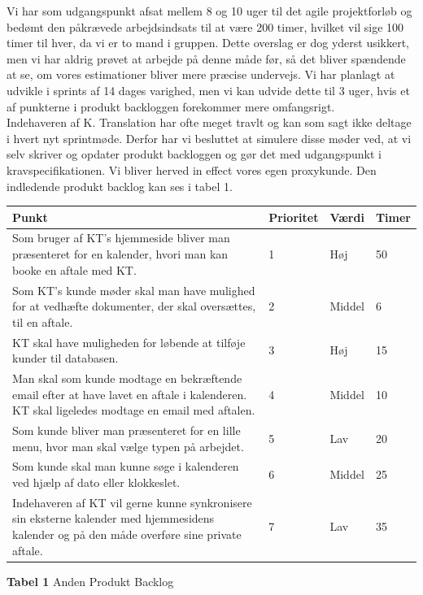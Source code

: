 \documentclass[12pt]{article}   %
\begin{document}
Vi har som udgangspunkt afsat mellem 8 og 10 uger til det agile projektforløb
og bedømt den påkrævede arbejdsindsats til at være 200 timer, hvilket vil sige 100
timer til hver, da vi er to mand i gruppen. Dette overslag er dog yderst
usikkert, men vi har aldrig prøvet at arbejde på denne måde før, så det bliver
spændende at se, om vores estimationer bliver mere præcise undervejs. Vi har
planlagt at udvikle i sprints af 14 dages varighed, men vi kan udvide dette til 3
uger, hvis et af punkterne i produkt backloggen forekommer mere omfangsrigt.\\
Indehaveren af K. Translation har ofte meget travlt og kan som sagt ikke
deltage i hvert nyt sprintmøde. Derfor har vi besluttet at simulere disse
møder ved, at vi selv skriver og opdater produkt backloggen og gør det med
udgangspunkt i kravspecifikationen. Vi bliver herved in effect vores egen 
proxykunde. Den indledende produkt backlog kan ses i tabel 1.

\begin{center}
	\begin{tabular}{|p{8cm}|l|l|l|}
		\hline
Punkt & Prioritet & Værdi & Timer \\ \hline
Som bruger af KT's hjemmeside bliver man præsenteret for en kalender, hvori man
kan booke en aftale med KT. & 1 & Høj &  50 \\ \hline
Som KT's kunde møder skal man have mulighed for at vedhæfte dokumenter, der skal oversættes, til en aftale. & 2 &
Middel & 6  \\ \hline
KT skal have muligheden for løbende at tilføje kunder til databasen. & 3 & Høj
& 15 \\ \hline
Man skal som kunde modtage en bekræftende email efter at have lavet en aftale
i kalenderen. KT skal ligeledes modtage en email med aftalen. & 4 & Middel & 10  \\ \hline
Som kunde bliver man præsenteret for en lille menu, hvor man skal vælge typen
på arbejdet. & 5 & Lav & 20\\ \hline
Som kunde skal man kunne søge i kalenderen ved hjælp af dato eller klokkeslet.
& 6  & Middel &  25 \\ \hline
Indehaveren af KT vil gerne kunne synkronisere sin eksterne kalender med
hjemmesidens kalender og på den måde overføre sine private aftale. & 7 & Lav &
 35 \\ \hline
\end{tabular}
\end{center}
\begin{center}\textbf{Tabel 1} Anden Produkt Backlog
\end{center}
\vspace{0.5cm}
\end{document}
